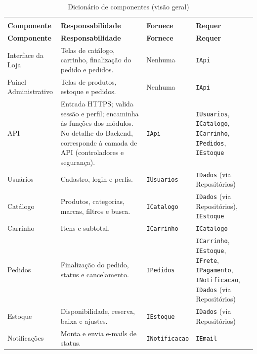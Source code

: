 \documentclass[12pt,a4paper]{article}
\begin{document}
{\small
{\setlength{\arrayrulewidth}{0.3pt}\renewcommand{\arraystretch}{1.15}
\begin{xltabular}{\textwidth}{>{\raggedright\arraybackslash}p{2.7cm}|>{\raggedright\arraybackslash}X|>{\raggedright\arraybackslash}p{2.6cm}|>{\raggedright\arraybackslash}p{3.0cm}}
\caption{Dicionário de componentes (visão geral)}\label{tab:dicionario}\\
\toprule{}
\textbf{Componente} & \textbf{Responsabilidade} & \textbf{Fornece} & \textbf{Requer}\\ \midrule{}
\endfirsthead
{}\toprule{}
\textbf{Componente} & \textbf{Responsabilidade} & \textbf{Fornece} & \textbf{Requer}\\ \midrule{}
\endhead
\endlastfoot
Interface da Loja & Telas de catálogo, carrinho, finalização do pedido e pedidos. & Nenhuma & \texttt{IApi}\\ \hline
Painel Administrativo & Telas de produtos, estoque e pedidos. & Nenhuma & \texttt{IApi}\\ \hline
API & Entrada HTTPS; valida sessão e perfil; encaminha às funções dos módulos. No detalhe do Backend, corresponde à camada de API (controladores e segurança). & \texttt{IApi} & \texttt{IUsuarios}, \texttt{ICatalogo}, \texttt{ICarrinho}, \texttt{IPedidos}, \texttt{IEstoque}\\ \hline
Usuários & Cadastro, login e perfis. & \texttt{IUsuarios} & \texttt{IDados} (via Repositórios)\\ \hline
Catálogo & Produtos, categorias, marcas, filtros e busca. & \texttt{ICatalogo} & \texttt{IDados} (via Repositórios), \texttt{IEstoque}\\ \hline
Carrinho & Itens e subtotal. & \texttt{ICarrinho} & \texttt{ICatalogo}\\ \hline
Pedidos & Finalização do pedido, status e cancelamento. & \texttt{IPedidos} & \texttt{ICarrinho}, \texttt{IEstoque}, \texttt{IFrete}, \texttt{IPagamento}, \texttt{INotificacao}, \texttt{IDados} (via Repositórios)\\ \hline
Estoque & Disponibilidade, reserva, baixa e ajustes. & \texttt{IEstoque} & \texttt{IDados} (via Repositórios)\\ \hline
Notificações & Monta e envia e-mails de status. & \texttt{INotificacao} & \texttt{IEmail}\\ \hline

\end{xltabular}}}
\end{document}
